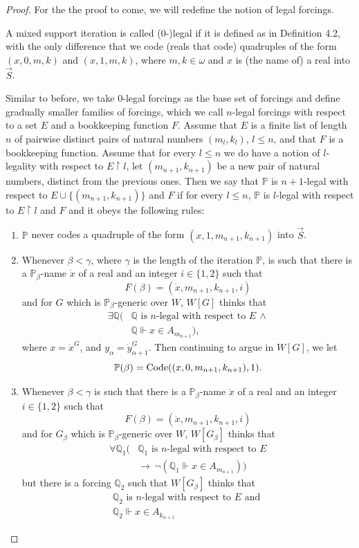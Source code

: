\documentclass[10pt,a4paper]{amsart}
\newcommand{\forceP}{\mathbb{P}}
\newcommand{\forceQ}{\mathbb{Q}}
\begin{document}
\begin{proof}


For the the proof to come, we will redefine the notion of legal forcings.
\begin{definition}
A mixed support iteration is called (0-)legal if it is defined as in Definition 4.2, with the only difference that we code (reals that code) quadruples of the form $(x,0,m,k)$ and $(x,1,m,k)$, where $m,k \in \omega$ and $x$ is (the name of) a real into $\vec{S}$.
\end{definition}
Similar to before, we take 0-legal forcings as the base set of forcings and define gradually smaller families of forcings, which we call $n$-legal forcings with respect to a set $E$ and a bookkeeping function $F$.
Assume that $E$ is a finite list of length $n$ of pairwise distinct pairs of natural numbers $(m_l, k_l)$, $l \le n$,
and that $F$ is a bookkeeping function.
Assume that for every $l \le n$ we do have a notion of $l$-legality with respect to $E \upharpoonright l$, let $(m_{n+1}, k_{n+1})$ be a new pair of natural numbers, distinct from the previous ones. Then we say that $\forceP$ is $n+1$-legal with respect to $E \cup \{ (m_{n+1}, k_{n+1} ) \}$ and $F$ if for every $l \le n$, $\forceP $ is $l$-legal with respect to $E \upharpoonright l$ and $F$ and it obeys the following rules:
\begin{enumerate}
\item $\forceP$ never codes a quadruple of the form $(x,1,m_{n+1},k_{n+1})$ into $\vec{S}$.
\item Whenever $\beta < \gamma $, where $\gamma$ is the length of the iteration $\forceP$, is such that there is a $\forceP_{\beta}$-name $\dot{x}$ of a real and an integer $ i\in\{1,2\}$ such that
\[F(\beta)= (\dot{x},m_{n+1},k_{n+1},i)\] and for  $G$ which is $\forceP_{\beta}$-generic over $W$, $W[G]$ thinks that
\begin{align*}
\exists \forceQ (&\forceQ \text{ is } n \text{-legal with respect to } E \,  \land \\&   \forceQ \Vdash x \in A_{m_{n+1}}),
\end{align*}
where $x=\dot{x}^G$, and $y_{\alpha}=\dot{y}_{\alpha+1}^G$.
Then continuing to argue in $W[G]$, we let
\[\forceP(\beta)= \hbox{Code}((x,0,m_{n+1},k_{n+1}),1).\] 

\item
Whenever $\beta < \gamma $ is such that there is a $\forceP_{\beta}$-name $\dot{x}$ of a real and an integer $ i\in\{1,2\}$ such that
\[F(\beta)= (\dot{x},m_{n+1},k_{n+1},i)\] and for $G_{\beta}$ which is $\forceP_{\beta}$-generic over $W$, $W[G_{\beta}]$ thinks that
\begin{align*}
\forall \forceQ_1 (&\forceQ_1 \text{ is } n \text{-legal with respect to } E  \\& \rightarrow \, \lnot(\forceQ_1 \Vdash x \in A_{m_{n+1}}))
\end{align*}
but there is a forcing $\forceQ_2$ such that $W[G_{\beta}]$ thinks that 
\begin{align*}
\forceQ_{2} \text{ is } n \text{-legal with respect to $E$ and } \\   {\forceQ_2} \Vdash x \in A_{k_{n+1}}
\end{align*}



\end{enumerate}
\end{proof}
\end{document}

